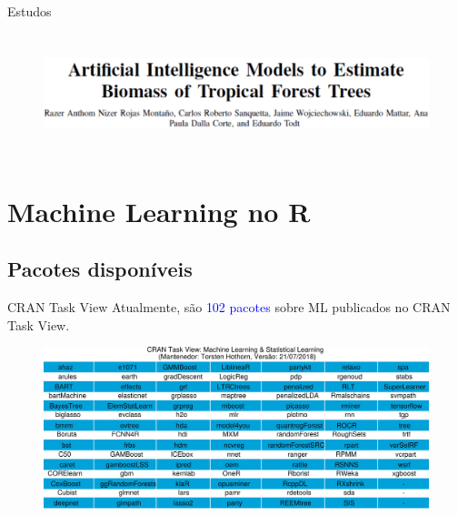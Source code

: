 \documentclass[12pt,ignorenonframetext,aspectratio=1610]{beamer}
\begin{document}
\begin{frame}[t]{Estudos}
	
	\begin{figure}[H]
		\centering
		\includegraphics[width=14cm, height=3.5cm]{Fig/Pub2.png}
		
	\end{figure}
	
\end{frame}

\section{Machine Learning no R}
\subsection{Pacotes disponíveis}

\begin{frame}[t]{CRAN Task View}
	\justifying
	Atualmente, são \textcolor{blue}{102 pacotes} sobre ML publicados no CRAN Task View.
	
	\begin{figure}[H]
		\centering
		\includegraphics[scale=0.6]{Fig/Task2.jpeg}
	\end{figure}
	
\end{frame}
\end{document}
